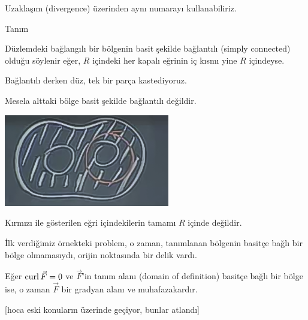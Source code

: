 \documentclass[12pt,fleqn]{article}\usepackage{../../common}
\begin{document}
Uzaklaşım (divergence) üzerinden aynı numarayı kullanabiliriz. 

Tanım 

Düzlemdeki bağlangılı bir bölgenin basit şekilde bağlantılı (simply
connected) olduğu söylenir eğer, $R$ içindeki her kapalı eğrinin iç kısmı
yine $R$ içindeyse. 

Bağlantılı derken düz, tek bir parça kastediyoruz.

Mesela alttaki bölge basit şekilde bağlantılı değildir. 

\includegraphics[height=4cm]{24_7.png}

Kırmızı ile gösterilen eğri içindekilerin tamamı $R$ içinde değildir. 

İlk verdiğimiz örnekteki problem, o zaman, tanımlanan bölgenin basitçe
bağlı bir bölge olmamasıydı, orijin noktasında bir delik vardı. 

Eğer $\operatorname{curl} \vec{F} = 0$ ve $\vec{F}$'in tanım alanı (domain of definition) 
basitçe bağlı 
bir bölge ise, o zaman $\vec{F}$ bir gradyan alanı ve muhafazakardır. 

[hoca eski konuların üzerinde geçiyor, bunlar atlandı]
\end{document}
